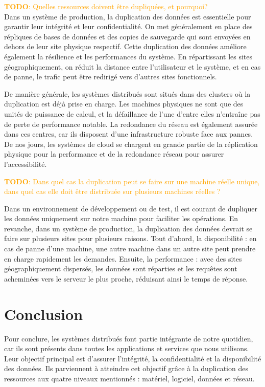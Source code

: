 \documentclass[a11paper, 11pt]{article}
\newcommand{\todo}[1]{\textcolor{orange}{\textbf{TODO}: #1}}
\begin{document}
\todo{Quelles ressources doivent être dupliquées, et pourquoi?} \\
Dans un système de production, la duplication des données est essentielle pour garantir leur intégrité et leur confidentialité. On met généralement en place des répliques de bases de données et des copies de sauvegarde qui sont envoyées en dehors de leur site physique respectif. Cette duplication des données améliore également la résilience et les performances du système. En répartissant les sites géographiquement, on réduit la distance entre l'utilisateur et le système, et en cas de panne, le trafic peut être redirigé vers d'autres sites fonctionnels.


De manière générale, les systèmes distribués sont situés dans des clusters où
la duplication est déjà prise en charge. Les machines physiques ne sont que des
unités de puissance de calcul, et la défaillance de l'une d'entre elles
n'entraîne pas de perte de performance notable. La redondance du réseau est
également assurée dans ces centres, car ils disposent d'une infrastructure
robuste face aux pannes. De nos jours, les systèmes de cloud se chargent en
grande partie de la réplication physique pour la performance et de la
redondance réseau pour assurer l'accessibilité.

\todo{Dans quel cas la duplication peut se faire sur une machine réelle unique, dans
quel cas elle doit être distribuée sur plusieurs machines réelles ?}

Dans un environnement de développement ou de test, il est courant de dupliquer
les données uniquement sur notre machine pour faciliter les opérations. En
revanche, dans un système de production, la duplication des données devrait se
faire sur plusieurs sites pour plusieurs raisons. Tout d'abord, la
disponibilité : en cas de panne d'une machine, une autre machine dans un autre
site peut prendre en charge rapidement les demandes. Ensuite, la performance :
avec des sites géographiquement dispersés, les données sont réparties et les
requêtes sont acheminées vers le serveur le plus proche, réduisant ainsi le
temps de réponse.

\section{Conclusion}

Pour conclure, les systèmes distribués font partie intégrante de notre
quotidien, car ils sont présents dans toutes les applications et services que
nous utilisons. Leur objectif principal est d'assurer l'intégrité, la
confidentialité et la disponibilité des données. Ils parviennent à atteindre
cet objectif grâce à la duplication des ressources aux quatre niveaux
mentionnés : matériel, logiciel, données et réseau.
\end{document}
